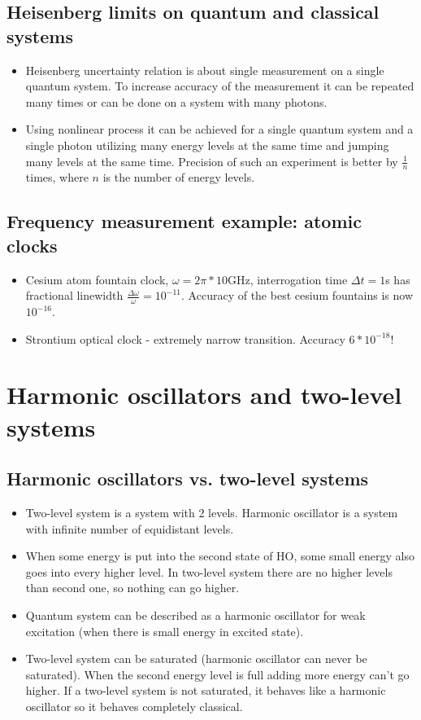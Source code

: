 \documentclass[AtomicOptical1Notes.tex]{subfiles}
\begin{document}
	\subsection{Heisenberg limits on quantum and classical systems}
		\begin{itemize}
			\item Heisenberg uncertainty relation is about single measurement on a single quantum system. To increase accuracy of the measurement it can be repeated many times or can be done on a system with many photons.
			\item Using nonlinear process it can be achieved for a single quantum system and a single photon utilizing many energy levels at the same time and jumping many levels at the same time. Precision of such an experiment is better by $\frac{1}{n}$ times, where $n$ is the number of energy levels.
		\end{itemize}
		
	\subsection{Frequency measurement example: atomic clocks}
		\begin{itemize}
			\item Cesium atom fountain clock, $\omega=2\pi*10$GHz, interrogation time $\Delta t=1$s has fractional linewidth $\frac{\Delta\omega}{\omega}=10^{-11}$. Accuracy of the best cesium fountains is now $10^{-16}$.
			\item Strontium optical clock - extremely narrow transition. Accuracy $6*10^{-18}$!
		\end{itemize}
		
\section{Harmonic oscillators and two-level systems}

	\subsection{Harmonic oscillators vs. two-level systems}
		\begin{itemize}
			\item Two-level system is a system with 2 levels. Harmonic oscillator is a system with infinite number of equidistant levels. 
			\item When some energy is put into the second state of HO, some small energy also goes into every higher level. In two-level system there are no higher levels than second one, so nothing can go higher.
			\item Quantum system can be described as a harmonic oscillator for weak excitation (when there is small energy in excited state).
			\item Two-level system can be saturated (harmonic oscillator can never be saturated). When the second energy level is full adding more energy can't go higher. If a two-level system is not saturated, it behaves like a harmonic oscillator so it behaves completely classical.
		\end{itemize}
		
\end{document}
